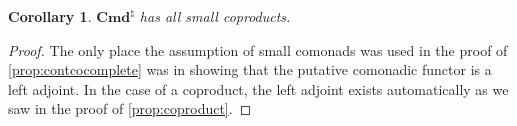 \documentclass[11pt, oneside, article]{memoir}
\theoremstyle{plain}
\newtheorem{corollary}[theorem]{Corollary}
\theoremstyle{definition}
\theoremstyle{remark}
\DeclarePairedDelimiter{\abs}{\lvert}{\rvert}
\newcommand{\namedcat}[1]{\mathbf{#1}}
\newcommand{\Set}{\namedcat{Set}}
\newcommand{\Con}{\namedcat{Cmd}^\natural}
\newcommand{\ConO}{\Con}
\newcommand{\ConOSet}{\ConO}
\newcommand{\CoalgOn}[2]{{#2}^{#1}}
\newcommand{\CoalgSet}[1]{\CoalgOn{#1}{\Set}}
\newcommand{\CoalgSetp}[1]{\CoalgOn{#1}{\Set}}
\newcommand{\clift}[1]{\overline{#1}}
\newcommand{\pts}[1]{{\abs{#1}}}
\newcommand{\one}[1]{\pts{#1}}
\newcommand{\carr}{\Sigma}
\newcommand{\reindex}[1]{\Delta_{#1}}
\newcommand{\car}[1]{\carr^{#1}}
\newcommand{\con}[2]{{#1}^{#2}}
\newcommand{\cmnd}[1]{{#1}}
\newcommand{\cC}{\cmnd{C}}
\newcommand{\cD}{\cmnd{D}}
\newcommand{\DSetp}{\CoalgSet{\cD}}
\newcommand{\SetpD}{\Set^\pts{\cD}}
\begin{document}
\begin{corollary}\label{prop:contcoprod}
  $\ConOSet$ has all small coproducts.
\end{corollary}
\begin{proof}
  The only place the assumption of small comonads was used in the proof of
  \cref{prop:contcocomplete} was in showing that the putative
  comonadic functor is a left adjoint. In the case of a coproduct, the
  left adjoint exists automatically as we saw in the proof of
  \cref{prop:coproduct}.
\end{proof}
\end{document}

